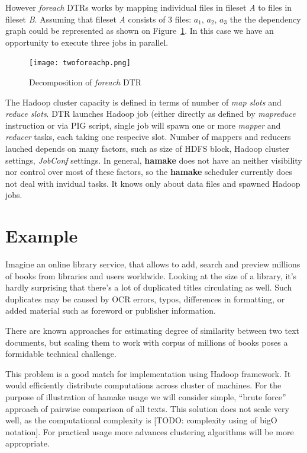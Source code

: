 \documentclass[10pt,conference,letterpaper]{IEEEtran}
\begin{document}
However \emph{foreach} DTRs works by mapping individual files in
fileset \textit{A} to files in fileset \textit{B}. Assuming that
fileset \textit{A} consists of 3 files: \textit{$a_1$},
\textit{$a_2$}, \textit{$a_3$} the the dependency graph could be
represented as shown on Figure~\ref{fig:foreach2}. In this case we
have an opportunity to execute three jobs in parallel.

\begin{figure}[htp]
\centering
\texttt{[image: twoforeachp.png]}
\caption{Decomposition of \emph{foreach} DTR}
\label{fig:foreach2}
\end{figure}

The Hadoop cluster capacity is defined in terms of number of
\textit{map slots} and \textit{reduce slots}. DTR launches Hadoop job
(either directly as defined by \emph{mapreduce} instruction or via PIG
script, single job will spawn one or more \emph{mapper} and
\emph{reducer} tasks, each taking one respecive slot. Number of
mappers and reducers lauched depends on many factors, such as size of
HDFS block, Hadoop cluster settings, \emph{JobConf} settings. In
general, \textbf{hamake} does not have an neither visibility nor
control over most of these factors, so the \textbf{hamake} scheduler
currently does not deal with invidual tasks. It knows only about data
files and spawned Hadoop jobs.

\section{Example}

Imagine an online library service, that allows to add, search and
preview millions of books from libraries and users worldwide. Looking
at the size of a library, it's hardly surprising that there's a lot of
duplicated titles circulating as well. Such duplicates may be caused
by OCR errors, typos, differences in formatting, or added material such as
foreword or publisher information.

There are known approaches for estimating degree of similarity between
two text documents, but scaling them to work with corpus of millions
of books poses a formidable technical challenge.

This problem is a good match for implementation using Hadoop
framework. It would efficiently distribute computations across cluster
of machines. For the purpose of illustration of hamake usage we will
consider simple, ``brute force'' approach of pairwise comparison of
all texts. This solution does not scale very well, as the
computational complexity is [TODO: complexity using of bigO
notation]. For practical usage more advances clustering algorithms
will be more appropriate.
\end{document}
